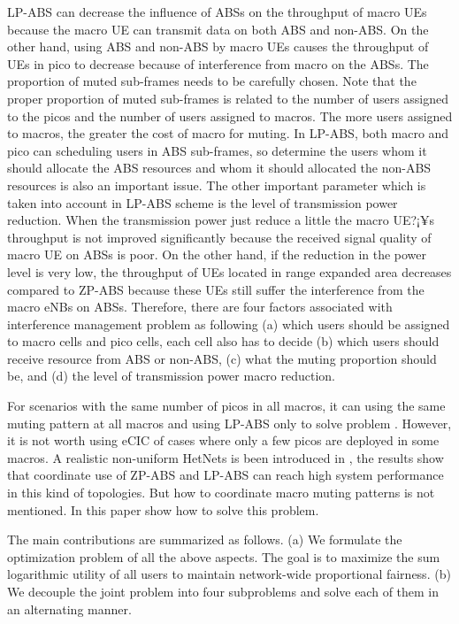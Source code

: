\documentclass[journal]{IEEETran}
\begin{document}
LP-ABS can decrease the influence of ABSs on the throughput of macro UEs because the macro UE can transmit data on both ABS and non-ABS. On the other hand, using ABS and non-ABS by macro UEs causes the throughput of UEs in pico to decrease because of interference from macro on the ABSs. The proportion of muted sub-frames needs to be carefully chosen. Note that the proper proportion of muted sub-frames is related to the number of users assigned to the picos and the number of users assigned to macros. The more users assigned to macros, the greater the cost of macro for muting. In LP-ABS, both macro and pico can scheduling users in ABS sub-frames, so determine the users whom it should allocate the ABS resources and whom it should allocated the non-ABS resources is also an important issue. The other important parameter which is taken into account in LP-ABS scheme is the level of transmission power reduction. When the transmission power just reduce a little the macro UE?¡¥s throughput is not improved significantly because the received signal quality of macro UE on ABSs is poor. On the other hand, if the reduction in the power level is very low, the throughput of UEs located in range expanded area decreases compared to ZP-ABS because these UEs still suffer the interference from the macro eNBs on ABSs. Therefore, there are four factors associated with interference management problem as following (a) which users should be assigned to macro cells and pico cells, each cell also has to decide (b) which users should receive resource from ABS or non-ABS, (c) what the muting proportion should be, and (d) the level of transmission power macro reduction.

For scenarios with the same number of picos in all macros, it can using the same muting pattern at all macros\cite{AlgorithmEicic} and using LP-ABS only to solve problem \cite{JointABSPower}. However, it is not worth using eCIC of cases where only a few picos are deployed in some macros. A realistic non-uniform HetNets is been introduced in \cite{NonUniformTopologies}, the results show that coordinate use of ZP-ABS and LP-ABS can reach high system performance in this kind of topologies. But how to coordinate macro muting patterns is not mentioned. In this paper show how to solve this problem.

The main contributions are summarized as follows. (a) We formulate the optimization problem of all the above aspects. The goal is to maximize the sum logarithmic utility of all users to maintain network-wide proportional fairness. (b) We decouple the joint problem into four subproblems and solve each of them in an alternating manner.
\end{document}
